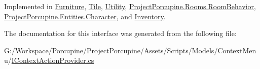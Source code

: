 Implemented in \hyperlink{class_furniture_ac89ee5662bc36695cc7d5b8eaa246f43}{Furniture}, \hyperlink{class_tile_abb0b61dee4ac0ed5af02165c45a6e688}{Tile}, \hyperlink{class_utility_a579c99983d713ac33be085976ef424df}{Utility}, \hyperlink{class_project_porcupine_1_1_rooms_1_1_room_behavior_a21b7f3134d1a74f70aa7a1d0f8ee9c23}{Project\+Porcupine.\+Rooms.\+Room\+Behavior}, \hyperlink{class_project_porcupine_1_1_entities_1_1_character_a57c4c3ef718c8e08d8c9c06df4a3b3f9}{Project\+Porcupine.\+Entities.\+Character}, and \hyperlink{class_inventory_aa7f9e191f5d4e2cdb012d3de59f2eacf}{Inventory}.



The documentation for this interface was generated from the following file\+:\begin{DoxyCompactItemize}
\item 
G\+:/\+Workspace/\+Porcupine/\+Project\+Porcupine/\+Assets/\+Scripts/\+Models/\+Context\+Menu/\hyperlink{_i_context_action_provider_8cs}{I\+Context\+Action\+Provider.\+cs}\end{DoxyCompactItemize}
